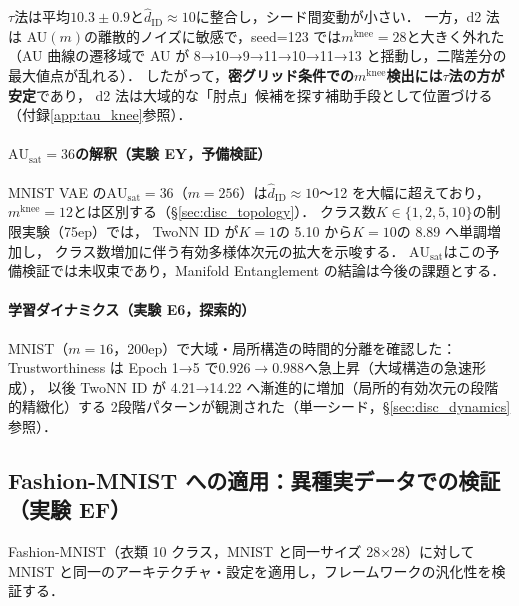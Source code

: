 \documentclass[11pt,a4paper]{jsarticle}
\newcommand{\AUsat}{\mathrm{AU}_{\mathrm{sat}}}
\newcommand{\mknee}{m^{\mathrm{knee}}}
\begin{document}
$\tau$法は平均$10.3 \pm 0.9$と$\hat{d}_\mathrm{ID} \approx 10$に整合し，シード間変動が小さい．
一方，d2 法は AU$(m)$の離散的ノイズに敏感で，seed=123 では$\mknee = 28$と大きく外れた
（AU 曲線の遷移域で AU が 8→10→9→11→10→11→13 と揺動し，二階差分の最大値点が乱れる）．
したがって，\textbf{密グリッド条件での$\mknee$検出には$\tau$法の方が安定}であり，
d2 法は大域的な「肘点」候補を探す補助手段として位置づける（付録\ref{app:tau_knee}参照）．

\paragraph{$\AUsat = 36$の解釈（実験 EY，予備検証）}
MNIST VAE の$\AUsat = 36$（$m=256$）は$\hat{d}_\mathrm{ID} \approx 10$〜12 を大幅に超えており，
$\mknee = 12$とは区別する（§\ref{sec:disc_topology}）．
クラス数$K \in \{1,2,5,10\}$の制限実験（75ep）では，
TwoNN ID が$K=1$の 5.10 から$K=10$の 8.89 へ単調増加し，
クラス数増加に伴う有効多様体次元の拡大を示唆する．
$\AUsat$はこの予備検証では未収束であり，Manifold Entanglement の結論は今後の課題とする．

\paragraph{学習ダイナミクス（実験 E6，探索的）}
MNIST（$m=16$，200ep）で大域・局所構造の時間的分離を確認した：
Trustworthiness は Epoch 1→5 で$0.926 \to 0.988$へ急上昇（大域構造の急速形成），
以後 TwoNN ID が 4.21→14.22 へ漸進的に増加（局所的有効次元の段階的精緻化）する
2段階パターンが観測された（単一シード，§\ref{sec:disc_dynamics}参照）．

\subsection{Fashion-MNIST への適用：異種実データでの検証（実験 EF）}\label{sec:exp_fashion}

Fashion-MNIST（衣類 10 クラス，MNIST と同一サイズ 28×28）に対して
MNIST と同一のアーキテクチャ・設定を適用し，フレームワークの汎化性を検証する．
\end{document}
